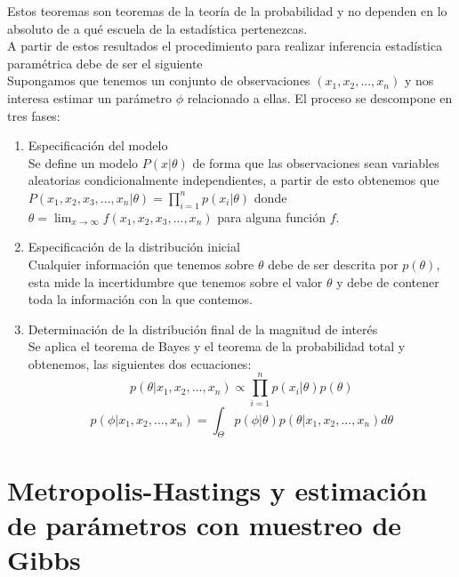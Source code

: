 Estos teoremas son teoremas de la teoría de la probabilidad y no dependen en lo absoluto de a qué escuela de la estadística pertenezcas. \\ A partir de estos resultados el procedimiento para realizar inferencia estadística paramétrica debe de ser el siguiente \\
Supongamos que tenemos un conjunto de observaciones $(x_{1},x_{2},...,x_{n})$ y nos interesa estimar un parámetro $\phi$ relacionado a ellas. El proceso se descompone en tres fases: \begin{enumerate}

    \item Especificación del modelo \\
    Se define un modelo $P(x\vert \theta)$ de forma que las observaciones sean variables aleatorias condicionalmente independientes, a partir de esto obtenemos que $P(x_{1},x_{2},x_{3},...,x_{n}\vert \theta)=\prod^{n}_{i=1} p(x_{i}\vert \theta)$ donde $\theta =\lim_{x \to \infty} f(x_{1},x_{2},x_{3},...,x_{n})$ para alguna función $f$.\\
    \item Especificación de la distribución inicial\\
    Cualquier información que tenemos sobre $\theta$ debe de ser descrita por $p(\theta)$, esta mide la incertidumbre que tenemos sobre el valor $\theta$ y debe de contener toda la información con la que contemos.\\
   
    \item Determinación de la distribución final de la magnitud de interés
    \\Se aplica el teorema de Bayes y el teorema de la probabilidad total y obtenemos, las siguientes dos ecuaciones:
    \begin{equation}
        p(\theta\vert x_{1},x_{2},...,x_{n}) \propto \prod^{n}_{i=1} p(x_{i}\vert \theta)p(\theta)
    \end{equation}
    \begin{equation}
        p(\phi\vert x_{1},x_{2},...,x_{n})=\int_{\Theta} p(\phi\vert \theta)p(\theta\vert x_{1},x_{2},...,x_{n})d\theta
    \end{equation}

\end{enumerate}

\section{Metropolis-Hastings y estimación de parámetros con muestreo de Gibbs}

